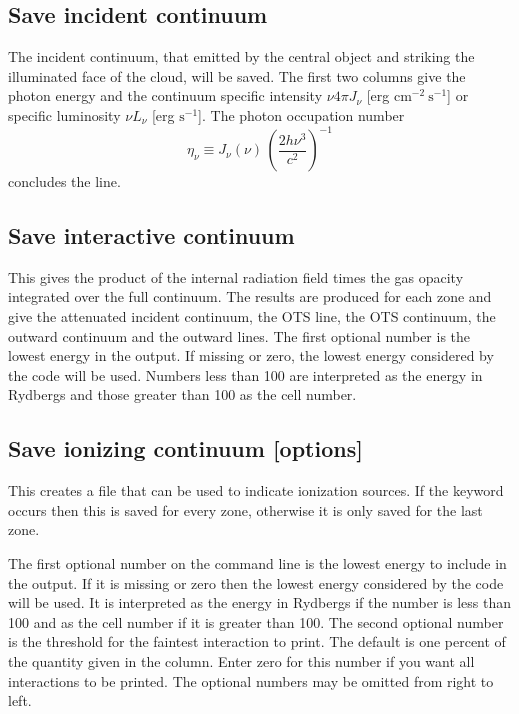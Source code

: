 \subsection{Save incident continuum}
\label{sec:CommandSaveIncidentContinuum}

The incident continuum, that emitted by the central object and striking
the illuminated face of the cloud, will be saved.  The first two columns give
the photon energy and the continuum specific intensity 
$\nu 4\pi J_{\nu}$ [erg cm$^{-2}\ \mathrm{s}^{-1}$] 
or specific luminosity 
$\nu L_{\nu}$ [erg  $\mathrm{s}^{-1}$].
The photon occupation number 
\begin{equation}
{\eta _\nu } \equiv {J_\nu }\left( \nu  \right)\,{\left( {\frac{{2h{\nu
^3}}}{{{c^2}}}} \right)^{ - 1}}
\end{equation}
concludes the line.

\subsection{Save interactive continuum}

This gives the product of the internal radiation field times the gas opacity integrated over the full continuum.  
The results are produced for each zone and give
the attenuated incident continuum, the OTS line, the OTS continuum, the
outward continuum and the outward lines.  The first optional number is the
lowest energy in the output.  If missing or zero, the lowest energy
considered by the code will be used.  Numbers less than 100 are interpreted
as the energy in Rydbergs and those greater than 100 as the cell number.

\subsection{Save ionizing continuum [options]}

This creates a file that can be used to indicate ionization sources.
If the keyword  occurs then this is saved for every zone, otherwise
it is only saved for the last zone.

The first optional number on the command line is the lowest energy to
include in the output.  If it is missing or zero then the lowest energy
considered by the code will be used.  It is interpreted as the energy in
Rydbergs if the number is less than 100 and as the cell number if it is
greater than 100.  The second optional number is the threshold for the
faintest interaction to print.  The default is one percent of the quantity
given in the  column.
Enter zero for this number if you want
all interactions to be printed.  The optional numbers may be omitted from
right to left.

